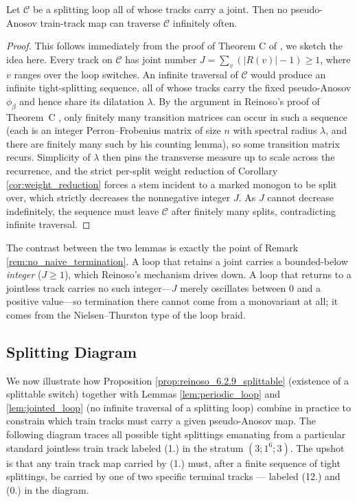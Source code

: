 \begin{lemma}
\label{lem:jointed_loop}
Let $\mathcal{C}$ be a splitting loop all of whose tracks carry a joint. Then no pseudo-Anosov train-track map can traverse $\mathcal{C}$ infinitely often.
\end{lemma}

\begin{proof}
This follows immediately from the proof of Theorem C of \cite{Reinoso2023}, we sketch the idea here. Every track on $\mathcal{C}$ has joint number $J = \sum_{v}(|R(v)| - 1) \ge 1$, where $v$ ranges over the loop switches. An infinite traversal of $\mathcal{C}$ would produce an infinite tight-splitting sequence, all of whose tracks carry the fixed pseudo-Anosov $\phi_\beta$ and hence share its dilatation $\lambda$. By the argument in Reinoso's proof of Theorem~C \cite[\S6.3]{reinoso2024pseudo}, only finitely many transition matrices can occur in such a sequence (each is an integer Perron--Frobenius matrix of size $n$ with spectral radius $\lambda$, and there are finitely many such by his counting lemma), so some transition matrix recurs. Simplicity of $\lambda$ then pins the transverse measure up to scale across the recurrence, and the strict per-split weight reduction of Corollary \ref{cor:weight_reduction} forces a stem incident to a marked monogon to be split over, which strictly decreases the nonnegative integer $J$. As $J$ cannot decrease indefinitely, the sequence must leave $\mathcal{C}$ after finitely many splits, contradicting infinite traversal.
\end{proof}

The contrast between the two lemmas is exactly the point of Remark \ref{rem:no_naive_termination}. A loop that retains a joint carries a bounded-below \emph{integer} ($J \ge 1$), which Reinoso's mechanism drives down. A loop that returns to a jointless track carries no such integer---$J$ merely oscillates between $0$ and a positive value---so termination there cannot come from a monovariant at all; it comes from the Nielsen--Thurston type of the loop braid.

\subsection*{Splitting Diagram}

We now illustrate how Proposition \ref{prop:reinoso_6.2.9_splittable} (existence of a splittable switch) together with Lemmas \ref{lem:periodic_loop} and \ref{lem:jointed_loop} (no infinite traversal of a splitting loop) combine in practice to constrain which train tracks must carry a given pseudo-Anosov map. The following diagram traces all possible tight splittings emanating from a particular standard jointless train track labeled (1.) in the stratum $(3; 1^6; 3)$. The upshot is that any train track map carried by (1.) must, after a finite sequence of tight splittings, be carried by one of two specific terminal tracks --- labeled (12.) and (0.) in the diagram.

